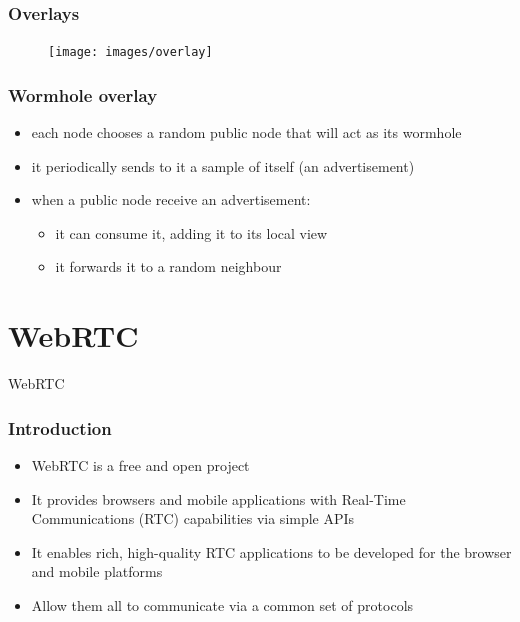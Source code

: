 \documentclass{beamer}
\begin{document}
\begin{frame}
\frametitle{Overlays}

\begin{figure}
\texttt{[image: images/overlay]}
\end{figure}

\end{frame}

\begin{frame}
\frametitle{Wormhole overlay}

\begin{itemize}
  \item each node chooses a random public node that will act as its wormhole
  \item it periodically sends to it a sample of itself (an advertisement)
  \item when a public node receive an advertisement:
  \begin{itemize}
    \item it can consume it, adding it to its local view
    \item it forwards it to a random neighbour
  \end{itemize}
\end{itemize}


\end{frame}

\section{WebRTC}

\begin{frame}[c]
\Huge{\centerline{WebRTC}}

\end{frame}

\begin{frame}
\frametitle{Introduction}

\begin{itemize}
  \item WebRTC is a free and open project 
  \item It provides browsers and mobile applications with Real-Time Communications (RTC) capabilities via simple APIs
  \item It enables rich, high-quality RTC applications to be developed for the browser and mobile platforms
  \item Allow them all to communicate via a common set of protocols
\end{itemize}

\end{frame}
\end{document}
